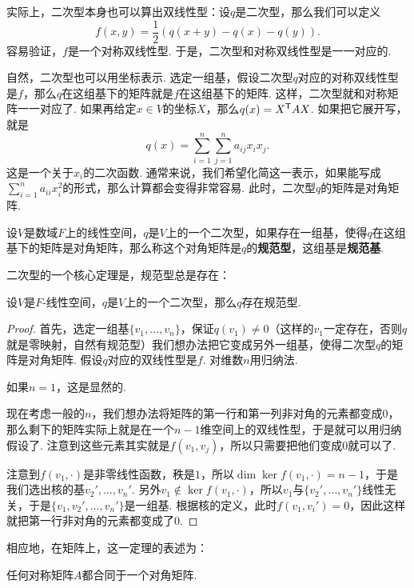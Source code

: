 实际上，二次型本身也可以算出双线性型：设$q$是二次型，那么我们可以定义
\[f(x,y)=\frac{1}{2}(q(x+y)-q(x)-q(y)).\]
容易验证，$f$是一个对称双线性型. 于是，二次型和对称双线性型是一一对应的. 

自然，二次型也可以用坐标表示. 选定一组基，假设二次型$q$对应的对称双线性型是$f$，那么$q$在这组基下的矩阵就是$f$在这组基下的矩阵. 这样，二次型就和对称矩阵一一对应了. 如果再给定$x\in V$的坐标$X$，那么$q(x)=X^{\mathsf{T}} AX$. 如果把它展开写，就是
\[
    q(x)=\sum_{i=1}^n\sum_{j=1}^n a_{ij}x_ix_j.
\]
这是一个关于$x_i$的二次函数. 通常来说，我们希望化简这一表示，如果能写成$\sum_{i=1}^n a_{ii}x_i^2$的形式，那么计算都会变得非常容易. 此时，二次型$q$的矩阵是对角矩阵. 

\begin{definition}[规范型]\label{definition:canonical-form}
    设$V$是数域$F$上的线性空间，$q$是$V$上的一个二次型，如果存在一组基，使得$q$在这组基下的矩阵是对角矩阵，那么称这个对角矩阵是$q$的\textbf{规范型}，这组基是\textbf{规范基}. 
\end{definition}

二次型的一个核心定理是，规范型总是存在：
\begin{theorem}\label{theorem:quadratic-form-diagonalization}
    设$V$是$F$-线性空间，$q$是$V$上的一个二次型，那么$q$存在规范型. 
\end{theorem}
\begin{proof}
首先，选定一组基$\{v_1,\dots,v_n\}$，保证$q(v_1)\neq 0$（这样的$v_1$一定存在，否则$q$就是零映射，自然有规范型）我们想办法把它变成另外一组基，使得二次型$q$的矩阵是对角矩阵. 假设$q$对应的双线性型是$f$. 对维数$n$用归纳法. 

如果$n=1$，这是显然的. 

现在考虑一般的$n$，我们想办法将矩阵的第一行和第一列非对角的元素都变成$0$，那么剩下的矩阵实际上就是在一个$n-1$维空间上的双线性型，于是就可以用归纳假设了. 注意到这些元素其实就是$f(v_1,v_j)$，所以只需要把他们变成$0$就可以了. 

注意到$f(v_1,\cdot)$是非零线性函数，秩是$1$，所以$\dim\ker f(v_1,\cdot)=n-1$，于是我们选出核的基$v_2',\dots,v_n'$. 另外$v_1\notin\ker f(v_1,\cdot)$，所以$v_1$与$\{v_2',\dots,v_n'\}$线性无关，于是$\{v_1,v_2',\dots,v_n'\}$是一组基. 根据核的定义，此时$f(v_1,v_i')=0$，因此这样就把第一行非对角的元素都变成了$0$. 
\end{proof}

相应地，在矩阵上，这一定理的表述为：
\begin{corollary}\label{corollary:quadratic-form-diagonalization}
任何对称矩阵$A$都合同于一个对角矩阵. 
\end{corollary}


